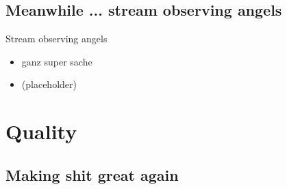 \documentclass[hyperref={pdfpagelabels=false},aspectratio=169]{beamer}
\begin{document}
\subsection{Meanwhile ... stream observing angels} %
\begin{frame}{Stream observing angels}
\begin{itemize}
\item  ganz super sache
\item  (placeholder)
\end{itemize} 
\end{frame}

\section{Quality}  %
\subsection{Making shit great again} 
\begin{frame}
\end{frame}
\end{document}
